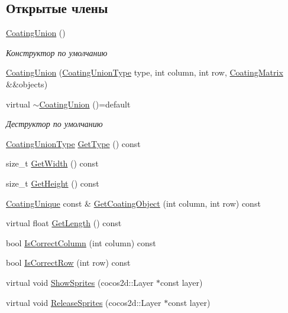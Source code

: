 \subsection*{Открытые члены}
\begin{DoxyCompactItemize}
\item 
\mbox{\label{classrtm_1_1_coating_union_aada3c299db0c6604b8a713d2ae87afbb}} 
\hyperlink{classrtm_1_1_coating_union_aada3c299db0c6604b8a713d2ae87afbb}{Coating\+Union} ()
\begin{DoxyCompactList}\small\item\em Конструктор по умолчанию \end{DoxyCompactList}\item 
\hyperlink{classrtm_1_1_coating_union_ad5c97fb37269028e9058c37c10428255}{Coating\+Union} (\hyperlink{namespacertm_a6a0d424be5696f64038e5e84a79cabfa}{Coating\+Union\+Type} type, int column, int row, \hyperlink{namespacertm_ae3bb29510cfde424975be31866d2486e}{Coating\+Matrix} \&\&objects)
\item 
\mbox{\label{classrtm_1_1_coating_union_a42d7554ae47b709c6518b84a9afe9a70}} 
virtual \hyperlink{classrtm_1_1_coating_union_a42d7554ae47b709c6518b84a9afe9a70}{$\sim$\+Coating\+Union} ()=default
\begin{DoxyCompactList}\small\item\em Деструктор по умолчанию \end{DoxyCompactList}\item 
\hyperlink{namespacertm_a6a0d424be5696f64038e5e84a79cabfa}{Coating\+Union\+Type} \hyperlink{classrtm_1_1_coating_union_a6e679033a648837c2df2b3b1ea749efd}{Get\+Type} () const
\item 
size\+\_\+t \hyperlink{classrtm_1_1_coating_union_aca7956667dce60916e9cd225694a2818}{Get\+Width} () const
\item 
size\+\_\+t \hyperlink{classrtm_1_1_coating_union_ac9530320f820757aec11c51bcf8eb3cc}{Get\+Height} () const
\item 
\hyperlink{namespacertm_ab0ec616a26920aeaf720d04e041e8ce3}{Coating\+Unique} const  \& \hyperlink{classrtm_1_1_coating_union_acbcdbbd157f6d55597a54bb639a977f2}{Get\+Coating\+Object} (int column, int row) const
\item 
virtual float \hyperlink{classrtm_1_1_coating_union_adf3ec4f4e8399c455aaa73bfe726b4ce}{Get\+Length} () const
\item 
bool \hyperlink{classrtm_1_1_coating_union_a7f77378af1ea7473d10497ad01effcad}{Is\+Correct\+Column} (int column) const
\item 
bool \hyperlink{classrtm_1_1_coating_union_abbd51ea78ee3d798807827f6ee930540}{Is\+Correct\+Row} (int row) const
\item 
virtual void \hyperlink{classrtm_1_1_coating_union_ae95be187677aec759723edb4d14b35c1}{Show\+Sprites} (cocos2d\+::\+Layer $\ast$const layer)
\item 
virtual void \hyperlink{classrtm_1_1_coating_union_a4e046aae25ce91da0408ac31a0de4e21}{Release\+Sprites} (cocos2d\+::\+Layer $\ast$const layer)
\end{DoxyCompactItemize}
